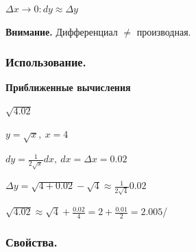 \documentclass{article}
\begin{document}
    \( \Delta x \to 0: dy \approx \Delta y \)

    \textbf{Внимание.} Дифференциал \(\neq\) производная.

    \subsubsection{Использование.}

    \textbf{Приближенные вычисления}

    \( \sqrt{4.02} \)

    \( y = \sqrt{x},\ x = 4\)
    
    \( dy = \frac{1}{2\sqrt{x}}dx,\ dx = \Delta x = 0.02 \)

    \( \Delta y = \sqrt{4 + 0.02} - \sqrt{4} \approx \frac{1}{2\sqrt{4}}0.02 \)

    \( \sqrt{4.02} \approx \sqrt{4} + \frac{0.02}{4} = 2 + \frac{0.01}{2} = 2.005 \)/

    \subsubsection{Свойства.}
\end{document}
